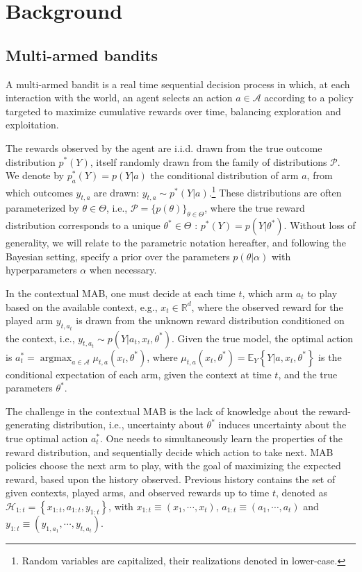 \documentclass{article}
\def \Real{{\mathbb R}}
\newcommand{\eValue}[2]{\mathbb{E}_{#1}\left\{ #2 \right\}}
\newcommand{\A}{\mathcal{A}}
\newcommand{\pstar}{p^*}
\newcommand{\thetastar}{\theta^*}
\newcommand{\HH}{\mathcal{H}}
\newcommand{\iid}{i.i.d. }
\newcommand{\ie}{i.e., }
\newcommand{\eg}{e.g., }
\newcommand{\argmax}{\mathop{\mathrm{argmax}}}
\begin{document}
\section{Background}
\label{sec:background}

\subsection{Multi-armed bandits}
\label{ssec:background_mab}
A multi-armed bandit is a real time sequential decision process in which, at each interaction with the world, an agent selects an action $a\in \A$ according to a policy targeted to maximize cumulative rewards over time, balancing exploration and exploitation.

The rewards observed by the agent are \iid drawn from the true outcome distribution $\pstar(Y)$, itself randomly drawn from the family of distributions $\mathcal{P}$. We denote by $p_a^*(Y)=p(Y|a)$ the conditional distribution of arm $a$, from which outcomes $y_{t,a}$ are drawn: $y_{t,a}\sim \pstar(Y|a)$.\footnote{Random variables are capitalized, their realizations denoted in lower-case.} These distributions are often parameterized by $\theta \in \Theta$, \ie $\mathcal{P}=\{p(\theta)\}_{\theta \in \Theta}$, where the true reward distribution corresponds to a unique $\theta^* \in \Theta$ : $\pstar(Y)=p(Y|\thetastar)$. Without loss of generality, we will relate to the parametric notation hereafter, and following the Bayesian setting, specify a prior over the parameters $p(\theta|\alpha)$ with hyperparameters $\alpha$ when necessary.

In the contextual MAB, one must decide at each time $t$, which arm $a_{t}$ to play based on the available context, \eg $x_{t}\in\Real^{d}$, where the observed reward for the played arm $y_{t,a_{t}}$ is drawn from the unknown reward distribution conditioned on the context, \ie $y_{t,a_t}\sim p(Y|a_t,x_t,\thetastar)$. Given the true model, the optimal action is $a_t^* = \argmax_{a \in \A} \mu_{t,a}(x_t,\thetastar)$, where $\mu_{t,a}(x_t,\thetastar)=\eValue{Y}{Y|a,x_t,\thetastar}$ is the conditional expectation of each arm, given the context at time $t$, and the true parameters $\theta^*$.

The challenge in the contextual MAB is the lack of knowledge about the reward-generating distribution, \ie uncertainty about $\thetastar$ induces uncertainty about the true optimal action $a_t^*$. One needs to simultaneously learn the properties of the reward distribution, and sequentially decide which action to take next. MAB policies choose the next arm to play, with the goal of maximizing the expected reward, based upon the history observed. Previous history contains the set of given contexts, played arms, and observed rewards up to time $t$, denoted as $\HH_{1:t}=\left\{x_{1:t}, a_{1:t}, y_{1:t}\right\}$, with $x_{1:t} \equiv (x_1, \cdots , x_t)$, $a_{1:t} \equiv (a_1, \cdots , a_t)$ and $y_{1:t} \equiv (y_{1,a_1}, \cdots , y_{t,a_t})$.
\end{document}
